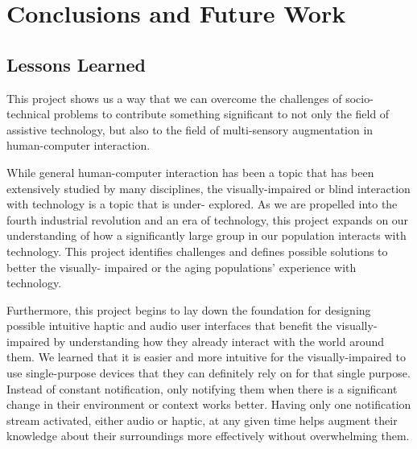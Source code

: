 
\section{Conclusions and Future Work}
\label{sect:conclusion}
% 
% 

\subsection{Lessons Learned}
This project shows us a way that we can overcome the challenges of socio-technical problems to contribute something significant to not only the field of assistive technology, but also to the field of multi-sensory augmentation in human-computer interaction.

While general human-computer interaction has been a topic that has been extensively studied by many disciplines, the visually-impaired or blind interaction with technology is a topic that is under- explored. As we are propelled into the fourth industrial revolution and an era of technology, this project expands on our understanding of how a significantly large group in our population interacts with technology. This project identifies challenges and defines possible solutions to better the visually- impaired or the aging populations' experience with technology.

Furthermore, this project begins to lay down the foundation for designing possible intuitive haptic and audio user interfaces that benefit the visually-impaired by understanding how they already interact with the world around them. We learned that it is easier and more intuitive for the visually-impaired to use single-purpose devices that they can definitely rely on for that single purpose. Instead of constant notification, only notifying them when there is a significant change in their environment or context works better. Having only one notification stream activated, either audio or haptic, at any given time helps augment their knowledge about their surroundings more effectively without overwhelming them.

